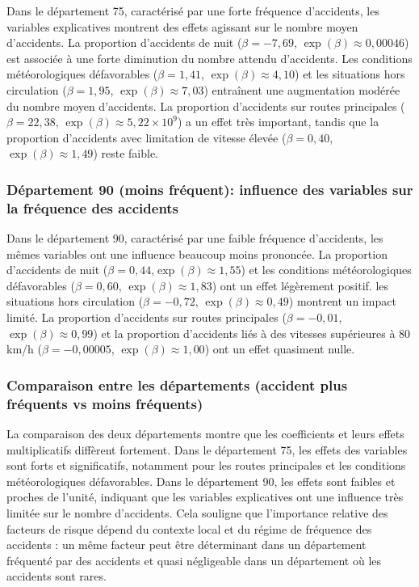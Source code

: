 \documentclass[11pt,a4paper]{article}
\begin{document}
Dans le département 75, caractérisé par une forte fréquence d'accidents, les variables explicatives montrent des effets agissant sur le nombre moyen d'accidents. La proportion d'accidents de nuit ($\beta = -7,69$, $\exp(\beta) \approx 0,00046$) est associée à une forte diminution du nombre attendu d'accidents. Les conditions météorologiques défavorables ($\beta = 1,41$, $\exp(\beta) \approx 4,10$) et les situations hors circulation ($\beta = 1,95$, $\exp(\beta) \approx 7,03$) entraînent une augmentation modérée du nombre moyen d'accidents. La proportion d'accidents sur routes principales ($\beta = 22,38$, $\exp(\beta) \approx 5,22 \times 10^9$) a un effet très important, tandis que la proportion d'accidents avec limitation de vitesse élevée ($\beta = 0,40$, $\exp(\beta) \approx 1,49$) reste faible.

\subsubsection{Département 90 (moins fréquent): influence des variables sur la fréquence des accidents}
Dans le département 90, caractérisé par une faible fréquence d'accidents, les mêmes variables ont une influence beaucoup moins prononcée. La proportion d'accidents de nuit ($\beta = 0,44$,$\exp(\beta)\approx 1,55$)  et les conditions météorologiques défavorables ($\beta = 0,60$, $\exp(\beta) \approx 1,83$) ont un effet légèrement positif.  les situations hors circulation ($\beta = -0,72$, $\exp(\beta) \approx 0,49$) montrent un impact limité. La proportion d'accidents sur routes principales ($\beta = -0,01$, $\exp(\beta) \approx 0,99$) et la proportion d'accidents liés à des vitesses supérieures à 80 km/h ($\beta = -0,00005$, $\exp(\beta) \approx 1,00$) ont un effet quasiment nulle.
\subsubsection{Comparaison entre les départements (accident plus fréquents vs moins fréquents)}

La comparaison des deux départements montre que les coefficients et leurs effets multiplicatifs diffèrent fortement. Dans le département 75, les effets des variables sont forts et significatifs, notamment pour les routes principales et les conditions météorologiques défavorables. Dans le département 90, les effets sont faibles et proches de l'unité, indiquant que les variables explicatives ont une influence très limitée sur le nombre d'accidents. Cela souligne que l'importance relative des facteurs de risque dépend du contexte local et du régime de fréquence des accidents : un même facteur peut être déterminant dans un département fréquenté par des accidents et quasi négligeable dans un département où les accidents sont rares.
\end{document}
